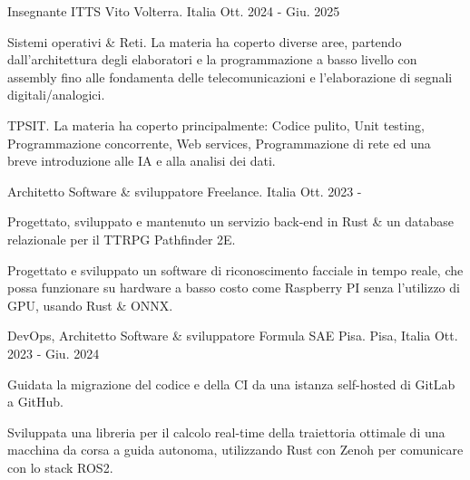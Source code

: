 
\begin{cventries}

  \cventry
  {Insegnante} %
  {ITTS Vito Volterra.} %
  {Italia} %
  {Ott. 2024 - Giu. 2025} %
  {
    \begin{cvitems} %
    \item {Sistemi operativi \& Reti. La materia ha coperto diverse aree, partendo dall'architettura degli elaboratori e la programmazione a basso livello con assembly fino alle fondamenta delle telecomunicazioni e l'elaborazione di segnali digitali/analogici.}
    \item {TPSIT. La materia ha coperto principalmente: Codice pulito, Unit testing, Programmazione concorrente, Web services, Programmazione di rete ed una breve introduzione alle IA e alla analisi dei dati.}
    \end{cvitems}
  }


  \cventry
  {Architetto Software \& sviluppatore} %
  {Freelance.} %
  {Italia} %
  {Ott. 2023 - } %
  {
    \begin{cvitems} %
    \item {Progettato, sviluppato e mantenuto un servizio back-end in Rust
      \& un database relazionale per il TTRPG Pathfinder 2E.}
    \item {Progettato e sviluppato un software di riconoscimento facciale in tempo reale, che possa funzionare su hardware a basso costo come Raspberry PI senza l'utilizzo di GPU, usando Rust \& ONNX.}
    \end{cvitems}
  }


  \cventry
  {DevOps, Architetto Software \& sviluppatore} %
  {Formula SAE Pisa.} %
  {Pisa, Italia} %
  {Ott. 2023 - Giu. 2024} %
  {
    \begin{cvitems} %
    \item {Guidata la migrazione del codice e della CI da una istanza self-hosted di GitLab a GitHub.}
    \item {Sviluppata una libreria per il calcolo real-time della traiettoria ottimale di una macchina da corsa a guida autonoma, utilizzando Rust con Zenoh per comunicare con lo stack ROS2.}
    \end{cvitems}
  }


\end{cventries}
